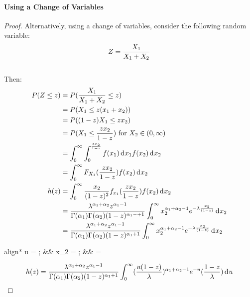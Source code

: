 \documentclass[12pt]{article}
\begin{document}
\paragraph{Using a Change of Variables}
\begin{proof}
	Alternatively, using a change of variables, consider the following random variable:\vspace*{-12pt}
	\begin{equation}
		Z = \frac{X_1}{X_1+X_2}\\
	\end{equation}\\[-38pt]
	Then:\vspace*{-12pt}
	\begin{equation}
		\begin{split}
			P(Z\le z)	&=	P(\frac{X_1}{X_1+X_2}\le z)\\
						&=	P(X_1\le z (x_1+ x_2))\\
						&=	P((1-z)X_1\le zx_2)\\
						&=	P(X_1\le {\frac{zx_2}{1-z}}) \text{ for } X_2 \in (0,\infty)\\
						&=	\int_{0}^{\infty}\int_{0}^{\frac{zx_2}{1-z}} f(x_1)\mathop{}\!\mathrm{d^{}}x_1 f(x_2)\mathop{}\!\mathrm{d^{}}x_2\\
						&=	\int_{0}^{\infty}F_{X_1}(\frac{z x_2}{1-z})f(x_2)\mathop{}\!\mathrm{d^{}}x_2\\
			h(z)		&=	\int_{0}^{\infty}\frac{x_2}{(1-z)^2}f_{x_1}(\frac{zx_2}{1-z})f(x_2)\mathop{}\!\mathrm{d^{}}x_2\\
						&=	\frac{\lambda^{\alpha_1+\alpha_2} z^{\alpha_1 - 1}}{\Gamma (\alpha _1) \Gamma (\alpha _2) (1-z)^{\alpha_1 -+1}} \int_{0}^{\infty} x_2^{\alpha_1 + \alpha_2 - 1} e^{-\lambda \frac{x_2}{(1-z)}}\mathop{}\!\mathrm{d^{}}x_2\\
						&=	\frac{\lambda^{\alpha_1+\alpha_2} z^{\alpha_1 - 1}}{\Gamma (\alpha _1) \Gamma (\alpha _2) (1-z)^{\alpha_1 +1}} \int_{0}^{\infty} x_2^{\alpha_1 + \alpha_2 - 1} e^{-\lambda \frac{x_2}{(1-z)}}\mathop{}\!\mathrm{d^{}}x_2\\
		\end{split}
	\end{equation}
	\begin{empheq}[box=\widefbox]{align*}
		u = ;	&&	x_2 = ;	&&	 = 
	\end{empheq}
	\begin{equation}
		\begin{split}
			h(z)	&=	\frac{\lambda^{\alpha_1+\alpha_2} z^{\alpha_1 - 1}}{\Gamma (\alpha _1) \Gamma (\alpha _2) (1-z)^{\alpha_1 +1}} \int_{0}^{\infty} (\frac{u (1-z)}{\lambda})^{\alpha_1 + \alpha_2 -1} e^{-u} (\frac{1-z}{\lambda})\diff{u}\\

\end{split}
\end{equation}
\end{proof}
\end{document}
